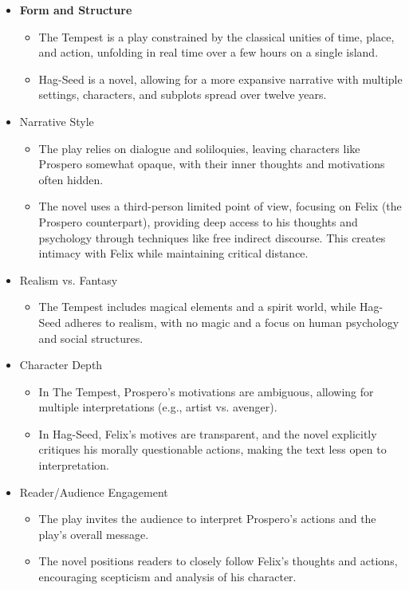	\begin{itemize}

		\item \textbf{Form and Structure}

			\begin{itemize}
				\item The Tempest is a play constrained by the classical unities of time, place, and action, unfolding in real time over a few hours on a single island.
				\item Hag-Seed is a novel, allowing for a more expansive narrative with multiple settings, characters, and subplots spread over twelve years.
			\end{itemize}

		\item Narrative Style

			\begin{itemize}
				\item 
				The play relies on dialogue and soliloquies, leaving characters like Prospero somewhat opaque, with their inner thoughts and motivations often hidden.
				\item The novel uses a third-person limited point of view, focusing on Felix (the Prospero counterpart), providing deep access to his thoughts and psychology through techniques like free indirect discourse. This creates intimacy with Felix while maintaining critical distance.
			\end{itemize}

		\item Realism vs. Fantasy

			\begin{itemize}
				\item The Tempest includes magical elements and a spirit world, while Hag-Seed adheres to realism, with no magic and a focus on human psychology and social structures.
			\end{itemize}

		\item Character Depth
			
			\begin{itemize}
				\item In The Tempest, Prospero's motivations are ambiguous, allowing for multiple interpretations (e.g., artist vs. avenger).
				\item In Hag-Seed, Felix's motives are transparent, and the novel explicitly critiques his morally questionable actions, making the text less open to interpretation.
			\end{itemize}

		\item Reader/Audience Engagement
			
			\begin{itemize}
				\item The play invites the audience to interpret Prospero's actions and the play's overall message.
				\item The novel positions readers to closely follow Felix's thoughts and actions, encouraging scepticism and analysis of his character. 
			\end{itemize}
	\end{itemize}
